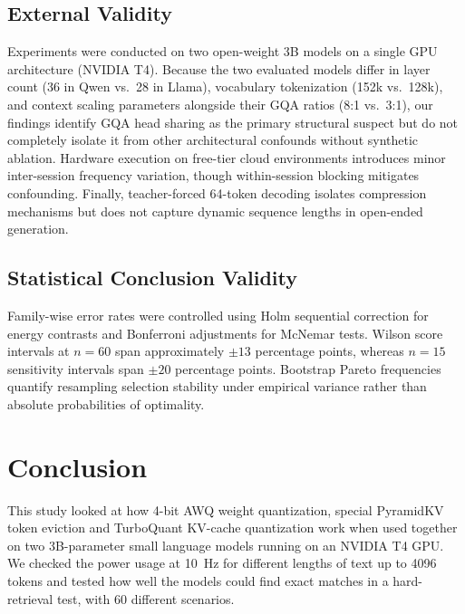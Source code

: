 \documentclass[sigconf,nonacm]{acmart}
\begin{document}
\begin{itemize}
\subsection{External Validity}
Experiments were conducted on two open-weight 3B models on a single GPU architecture (NVIDIA T4). Because the two evaluated models differ in layer count (36 in Qwen vs.\ 28 in Llama), vocabulary tokenization (152k vs.\ 128k), and context scaling parameters alongside their GQA ratios (8:1 vs.\ 3:1), our findings identify GQA head sharing as the primary structural suspect but do not completely isolate it from other architectural confounds without synthetic ablation. Hardware execution on free-tier cloud environments introduces minor inter-session frequency variation, though within-session blocking mitigates confounding. Finally, teacher-forced 64-token decoding isolates compression mechanisms but does not capture dynamic sequence lengths in open-ended generation.

\subsection{Statistical Conclusion Validity}
Family-wise error rates were controlled using Holm sequential correction for energy contrasts and Bonferroni adjustments for McNemar tests. Wilson score intervals at $n=60$ span approximately $\pm 13$ percentage points, whereas $n=15$ sensitivity intervals span $\pm 20$ percentage points. Bootstrap Pareto frequencies quantify resampling selection stability under empirical variance rather than absolute probabilities of optimality.


\section{Conclusion}

This study looked at how 4-bit AWQ weight quantization, special PyramidKV token eviction and TurboQuant KV-cache quantization work when used together on two 3B-parameter small language models running on an NVIDIA T4 GPU. We checked the power usage at 10~Hz for different lengths of text up to 4096 tokens and tested how well the models could find exact matches in a hard-retrieval test, with 60 different scenarios.


\end{itemize}
\end{document}
